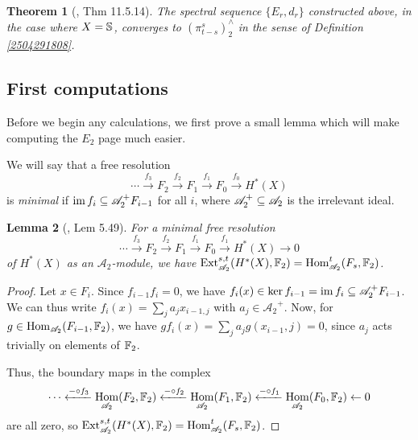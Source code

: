 \documentclass[11pt, titlepage]{article} %
\def\bb{\ensuremath\mathbb}
\def\subq{\ensuremath\subseteq}
\def\A{\ensuremath{\mathscr{A}_2}}
\DeclareMathOperator{\Ext}{Ext}
\DeclareMathOperator{\Hom}{Hom}
\DeclareMathOperator{\im}{im}
\numberwithin{equation}{subsection}
\theoremstyle{plain}
\newtheorem{theorem}{Theorem}[subsection]
\newtheorem{lemma}[theorem]{Lemma}
\theoremstyle{definition}
\begin{document}
\begin{theorem}[{\autocite{rognes2}, Thm 11.5.14}]\label{2504081125}
The spectral sequence \(\{E_r, d_r\}\) constructed above, in the case where \(X=\bb{S}\), converges to \((\pi_{t-s}^s)^\wedge_2\) in the sense of Definition \ref{2504291808}.
\end{theorem}



\subsection{First computations}\label{2504291249}

Before we begin any calculations, we first prove a small lemma which will make computing the \(E_2\) page much easier. 

We will say that a free resolution
\[\cdots \xrightarrow{f_3} F_2 \xrightarrow{f_2} F_1 \xrightarrow{f_1} F_0 \xrightarrow{f_0} H^*(X)\]
is \textit{minimal} if \(\im f_i \subq \A^+F_{i-1}\) for all \(i\), where \(\A^+\subq \A\) is the irrelevant ideal. 

\begin{lemma}[{\autocite{hatcher5}, Lem 5.49}]\label{2503171645shutupitsbeenalongterm}
For a minimal free resolution 
\[\cdots \xrightarrow{f_3} F_2 \xrightarrow{f_2} F_1 \xrightarrow{f_1} F_0 \xrightarrow{f_1} H^*(X) \to 0\]
of \(H^*(X)\) as an \(\A\)-module, we have \(\Ext_{\A}^{s,t}(H^*(X), \bb{F}_2)=\Hom^t_{\A}(F_s, \bb{F}_2)\).
\end{lemma}

\begin{proof}
Let \(x \in F_i\). Since \(f_{i-1}f_i=0\), we have \(f_i(x)\in \ker f_{i-1}=\im f_i\subq \A^+F_{i-1}\). We can thus write \(f_i(x)=\sum_j a_j x_{i-1,j}\) with \(a_j \in \A^+\). Now, for \(g \in \Hom_{\A}(F_{i-1}, \bb{F}_2)\), we have \(gf_i(x)=\sum_j a_j g(x_{i-1},j)=0\), since \(a_j\) acts trivially on elements of \(\bb{F}_2\). 

Thus, the boundary maps in the complex
\[\cdots \xleftarrow{-\circ f_3}\Hom_{\A}(F_2, \bb{F}_2) \xleftarrow{-\circ f_2}\Hom_{\A}(F_1, \bb{F}_2) \xleftarrow{-\circ f_1} \Hom_{\A}(F_0, \bb{F}_2)\leftarrow 0\]
are all zero, so \(\Ext_{\A}^{s,t}(H^*(X), \bb{F}_2)=\Hom^t_{\A}(F_s, \bb{F}_2)\).
\end{proof}
\end{document}
